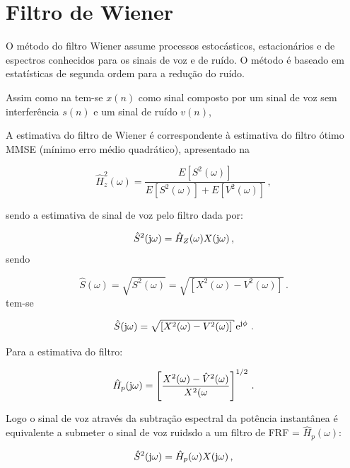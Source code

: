 \section{Filtro de Wiener}
O método do filtro Wiener assume processos estocásticos, estacionários e de espectros conhecidos para os sinais de voz e de ruído. O método é baseado em estatísticas de segunda ordem para a redução do ruído.

Assim como na  tem-se $x(n)$ como sinal composto por um sinal de voz sem interferência $s(n)$ e um sinal de ruído $v(n)$,

A estimativa do filtro de Wiener é correspondente à estimativa do filtro ótimo MMSE (mínimo erro médio quadrático), apresentado na 

\begin{equation}
    \hat{H}_z^2(\omega) =\dfrac{E[S^2(\omega)]}{E[S^2(\omega)]+E[V^2(\omega)]} \,,
    \label{eq6}
\end{equation}

\noindent

sendo a estimativa de sinal de voz pelo filtro dada por:

\begin{equation}
    \hat{S}^2(\operatorname{j\!} \omega) = \hat{H}_Z(\omega)X(\operatorname{j\!}\omega) \,,
    \label{eq7}
\end{equation}
\noindent
sendo 

\begin{equation}
   \hat{S}(\omega) = \sqrt{S^2(\omega)} = \sqrt{[X^2(\omega)-V^2(\omega)]} \,.
    \label{eq8}
\end{equation}
\noindent
tem-se 

\begin{equation}
   \hat{S}(\ji\omega) = \sqrt{[X^2(\omega)-V^2(\omega)]}\e^{\ji\phi} \,.
    \label{eq9}
\end{equation}

Para a estimativa do filtro:

\begin{equation}
   \hat{H}_p(\operatorname{j\!}\omega) = \left[\dfrac{X^2(\omega)-\hat{V}^2(\omega)}{X^2(\omega}\right]^{1/2} \,.
    \label{eq10}
\end{equation}

\noindent
Logo o sinal de voz através da subtração espectral da potência instantânea é equivalente a submeter o sinal de voz ruidsdo a um filtro de FRF = $\hat{H}_p(\omega)$:

\begin{equation}
    \hat{S}^2(\operatorname{j\!} \omega) = \hat{H}_{p}(\omega)X(\operatorname{j\!}\omega) \,,
    \label{eq11}
\end{equation}


